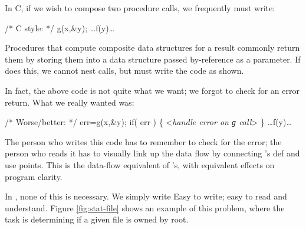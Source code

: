In C, if we wish to compose two procedure calls, we frequently must write:
\begin{code}
/* C style: */
g(x,&y);
{\ldots}f(y)\ldots\end{code}
Procedures that compute composite data structures for a result
commonly return them by storing them into a data structure passed
by-reference as a parameter.
If  does this, we cannot nest calls, but must write the code as shown.

In fact, the above code is not quite what we want; we forgot to check 
for an error return.
What we really wanted was:
\begin{code}
/* Worse/better: */
err=g(x,&y);
if( err ) \{
    <{\it{handle error on {\tt{g}} call}}>
    \}
{\ldots}f(y)\ldots\end{code}
The person who writes this code has to remember to check for the error;
the person who reads it has to visually link up the data flow by
connecting 's def and use points.
This is the data-flow equivalent of 's, 
with equivalent effects on program clarity.

In {\Scheme}, none of this is necessary. We simply write
Easy to write; easy to read and understand.
Figure \ref{fig:stat-file} shows an example of this problem, where the
task is determining if a given file is owned by root.
\begin{figure}[bthp]
\end{figure}

